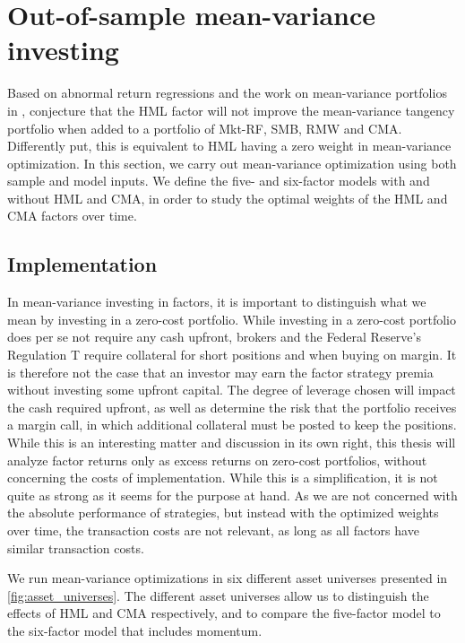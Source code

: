 
\section{Out-of-sample mean-variance investing}
\label{sec:mean_variance}

Based on abnormal return regressions and the work on mean-variance portfolios in \textcite{HubermanKandel1987}, \textcite{FF2015} conjecture that the HML factor will not improve the mean-variance tangency portfolio when added to a portfolio of Mkt-RF, SMB, RMW and CMA. Differently put, this is equivalent to HML having a zero weight in mean-variance optimization. In this section, we carry out mean-variance optimization using both sample and model inputs. We define the five- and six-factor models with and without HML and CMA, in order to study the optimal weights of the HML and CMA factors over time.

\subsection{Implementation}

In mean-variance investing in factors, it is important to distinguish what we mean by investing in a zero-cost portfolio. While investing in a zero-cost portfolio does per se not require any cash upfront, brokers and the Federal Reserve's Regulation T require collateral for short positions and when buying on margin. It is therefore not the case that an investor may earn the factor strategy premia without investing some upfront capital. The degree of leverage chosen will impact the cash required upfront, as well as determine the risk that the portfolio receives a margin call, in which additional collateral must be posted to keep the positions. While this is an interesting matter and discussion in its own right, this thesis will analyze factor returns only as excess returns on zero-cost portfolios, without concerning the costs of implementation. While this is a simplification, it is not quite as strong as it seems for the purpose at hand. As we are not concerned with the absolute performance of strategies, but instead with the optimized weights over time, the transaction costs are not relevant, as long as all factors have similar transaction costs.

We run mean-variance optimizations in six different asset universes presented in \autoref{fig:asset_universes}. The different asset universes allow us to distinguish the effects of HML and CMA respectively, and to compare the five-factor model to the six-factor model that includes momentum. 

